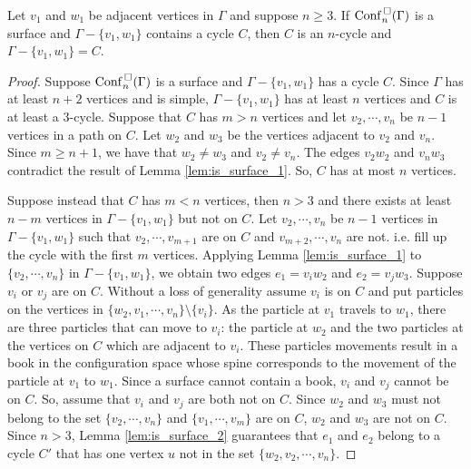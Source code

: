\begin{lem}
\label{lem:is_surface_C}
Let \(v_1\) and \(w_1\) be adjacent vertices in \(\Gamma\) and suppose \(n \ge 3\).
If \(\mathrm{Conf}^{\,\square}_n(\Gamma)\) is a surface and \(\Gamma - \{v_1, w_1\}\) contains a cycle \(C\),
then \(C\) is an \(n\)-cycle and \(\Gamma - \{v_1, w_1\} = C\). 
\end{lem}
\begin{proof}
Suppose \(\mathrm{Conf}^{\,\square}_n(\Gamma)\) is a surface and \(\Gamma - \{v_1, w_1\}\) has a cycle \(C\).
Since \(\Gamma\) has at least \(n + 2\) vertices and is simple, 
\(\Gamma - \{v_1, w_1\}\) has at least \(n\) vertices and \(C\) is at least a \(3\)-cycle.
Suppose that \(C\) has \(m > n\) vertices and let \(v_2, \cdots, v_n\) be \(n-1\) vertices in a path on \(C\).
Let \(w_2\) and \(w_3\) be the vertices adjacent to \(v_2\) and \(v_n\).
Since \(m \ge n + 1\), we have that \(w_2 \neq w_3\) and \(v_2 \neq v_n\).
The edges \(v_2 w_2\) and \(v_n w_3\) contradict the result of Lemma \ref{lem:is_surface_1}.
So, \(C\) has at most \(n\) vertices.

Suppose instead that \(C\) has \(m < n\) vertices, then \(n > 3\) and there exists at least \(n - m\) vertices in \(\Gamma - \{v_1, w_1\}\) but not on \(C\).
Let \(v_2, \cdots, v_n\) be \(n - 1\) vertices in \(\Gamma - \{v_1, w_1\}\) such that \(v_2, \cdots, v_{m + 1}\) are on \(C\) and
\(v_{m + 2}, \cdots, v_n\) are not. i.e. fill up the cycle with the first \(m\) vertices.
Applying Lemma \ref{lem:is_surface_1} to \(\{v_2, \cdots, v_n\}\) in \(\Gamma - \{v_1, w_1\}\), we obtain two edges \(e_1 = v_i w_2\) and \(e_2 = v_j w_3\).
Suppose \(v_i\) or \(v_j\) are on \(C\). Without a loss of generality assume \(v_i\) is on \(C\) and
put particles on the vertices in \(\{w_2, v_1, \cdots, v_n\}\setminus\{v_i\}\).
As the particle at \(v_1\) travels to \(w_1\), there are three particles that can move to \(v_i\): the particle at \(w_2\) and the two
particles at the vertices on \(C\) which are adjacent to \(v_i\).
These particles movements result in a book in the configuration space whose spine corresponds to the movement of the particle at \(v_1\) to \(w_1\).
Since a surface cannot contain a book, \(v_i\) and \(v_j\) cannot be on \(C\).
So, assume that \(v_i\) and \(v_j\) are both not on \(C\).
Since \(w_2\) and \(w_3\) must not belong to the set \(\{v_2, \cdots, v_n\}\) and \(\{v_1, \cdots, v_m\}\) are on \(C\),
\(w_2\) and \(w_3\) are not on \(C\).
Since \(n > 3\), Lemma \ref{lem:is_surface_2} guarantees that \(e_1\) and \(e_2\) belong to a cycle \(C'\) that has one vertex \(u\) not in
the set \(\{w_2, v_2, \cdots, v_n\}\).


\end{proof}
